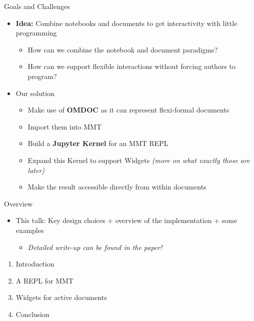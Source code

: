 \documentclass{beamer}
\begin{document}
    \begin{frame}{Goals and Challenges}
        \begin{itemize}
            \item \textbf{Idea:} Combine notebooks and documents to get interactivity with little programming
            \begin{itemize}
                \item How can we combine the notebook and document paradigms?
                \item How can we support flexible interactions without forcing authors to program?
            \end{itemize}

            \item Our solution
            \begin{itemize}
                \item Make use of \textbf{OMDOC} as it can represent flexi-formal documents
                \item Import them into MMT
                \item Build a \textbf{Jupyter Kernel} for an MMT REPL
                \item Expand this Kernel to support Widgets \textit{(more on what exactly those are later)}
                \item Make the result accessible directly from within documents
            \end{itemize}
        \end{itemize}
    \end{frame}

    \begin{frame}{Overview}

        \begin{itemize}
            \item This talk: Key design choices + overview of the implementation + some examples
            \begin{itemize}
                \item \textit{Detailed write-up can be found in the paper!}
            \end{itemize}
        \end{itemize}

        \begin{enumerate}
            \item Introduction
            \item A REPL for MMT
            \item Widgets for active documents
            \item Conclusion
        \end{enumerate}
    \end{frame}
\end{document}
